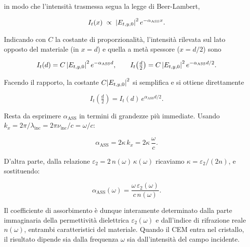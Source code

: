 \begin{solution}
in modo che l'intensità trasmessa segua la legge di Beer-Lambert,

\begin{equation}
    I_t(x) \;\propto\; \abs{E_{t,y,0}}^{2} \, e^{- \alpha_{\text{ASS}} x}.
\end{equation}

Indicando con \( C \) la costante di proporzionalità, l'intensità rilevata sul lato opposto del materiale (in \( x = d \)) e quella a metà spessore (\( x = d/2 \)) sono

\begin{equation}
    I_t(d) = C \, \abs{E_{t,y,0}}^{2} \, e^{- \alpha_{\text{ASS}} d}, \qquad I_t\!\left( \tfrac{d}{2} \right) = C \, \abs{E_{t,y,0}}^{2} \, e^{- \alpha_{\text{ASS}} d/2}.
\end{equation}

Facendo il rapporto, la costante \( C \abs{E_{t,y,0}}^{2} \) si semplifica e si ottiene direttamente

\begin{equation}
    I_t\!\left( \tfrac{d}{2} \right) = I_t(d) \, e^{\alpha_{\text{ASS}} d/2}.
\end{equation}

Resta da esprimere \( \alpha_{\text{ASS}} \) in termini di grandezze più immediate. Usando \( k_x = 2\pi/\lambda_{\text{inc}} = 2\pi \nu_{\text{inc}}/c = \omega/c \):

\begin{equation}
    \alpha_{\text{ASS}} = 2 \kappa \, k_x = 2 \kappa \, \frac{\omega}{c}.
\end{equation}

D'altra parte, dalla relazione \( \varepsilon_2 = 2 \, n(\omega) \, \kappa(\omega) \) ricaviamo \( \kappa = \varepsilon_2/(2 n) \), e sostituendo:

\begin{importantbox}
    \begin{equation}
        \alpha_{\text{ASS}}(\omega) = \frac{\omega \, \varepsilon_2(\omega)}{c \, n(\omega)}.
    \end{equation}
\end{importantbox}

Il coefficiente di assorbimento è dunque interamente determinato dalla parte immaginaria della permettività dielettrica \( \varepsilon_2(\omega) \) e dall'indice di rifrazione reale \( n(\omega) \), entrambi caratteristici del materiale. Quando il CEM entra nel cristallo, il risultato dipende sia dalla frequenza \( \omega \) sia dall'intensità del campo incidente.
\end{solution}

